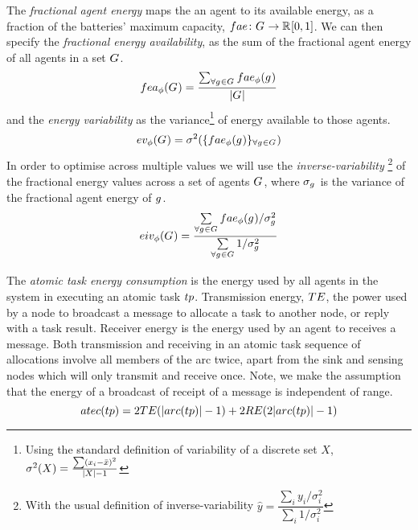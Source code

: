 The \textit{fractional agent energy} maps the an agent to its available energy, as a fraction of the batteries' maximum capacity, $\formalAgentEnergyAvailable{}{}$. We can then specify the \textit{fractional energy availability}, as the sum of the fractional agent energy of all agents in a set $G_{}^{}$.
	\begin{equation}
		\functionFractionalEnergyAvailable{}{} 
		= \dfrac{\sum_{\forall \varAgent{}{} \in \setAgents{}{}} \functionAgentEnergyAvailable{\varAgent{i}{}}{}}
		{\funcSize{\setAgents{}{}}}
	\end{equation}
and the \textit{energy variability} as the variance\footnote{Using the standard definition of variability of a discrete set $X$, $\sigma^2(X) = \frac{\sum (x_i - \bar{x})^2}{\lvert X \rvert-1}$} of energy available to those agents.
	\begin{equation}     	
		\functionEnergyVariability{}{} 
		= \sigma^2(
			\lbrace \functionAgentEnergyAvailable{}{}
			\rbrace_{\forall \varAgent{}{} \in \setAgents{}{}}
		)
	\end{equation}
In order to optimise across multiple values we will use the \textit{inverse-variability} \footnote{With the usual definition of inverse-variability $\hat{y} =
	\dfrac{\sum_{i} y_i/\sigma_{i}^2}{\sum_{i} 1/\sigma_{i}^2}$} of the fractional energy values across a set of agents $G_{}^{}$, where $\sigma_{g_{}^{}}$ is the variance of the fractional agent energy of $g_{}^{}$.
\begin{equation}
	\functionEnergyInverseVariability{}{}
	=
	\dfrac
	{
		\sum\limits_{\forall \varAgent{}{} \in \setAgents{}{}} \functionAgentEnergyAvailable{\varAgent{}{}}{} / \sigma_{\varAgent{}{}}^2
	}
	{
		\sum\limits_{\forall \varAgent{}{} \in \setAgents{}{}} 
		1/\sigma_{\varAgent{}{}}^2
	}
\end{equation}

\newcommand{\functionTaskEnergyConsumption}[2]{
	\functionSignature{atec}
	{\varAtomicTask{}{}}
}
The \textit{atomic task energy consumption} is the energy used by all agents in the system in executing an atomic task $\varAtomicTask{}{}$. Transmission energy, $TE$, the power used by a node to  broadcast a message to allocate a task to another node, or reply with a task result. Receiver energy is the energy used by an agent to receives a message. Both transmission and receiving in an atomic task sequence of allocations involve all members of the arc twice, apart from the sink and sensing nodes which will only transmit and receive once. Note, we make the assumption that the energy of a broadcast of receipt of a message is independent of range. 
\begin{equation}
	\functionTaskEnergyConsumption{}{} 
	= 2\varTransmissionEnergy{}{} (\funcSize{\functionTaskArc{}{}}{} - 1)
	+ 2\varReceiverEnergy{}{} (2 \funcSize{\functionTaskArc{}{}}{} - 1)
\end{equation}
